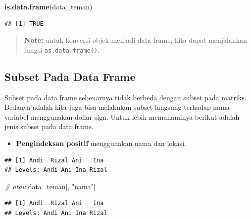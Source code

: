 \documentclass[]{book}
\newenvironment{Shaded}{\begin{snugshade}}{\end{snugshade}}
\newcommand{\KeywordTok}[1]{\textcolor[rgb]{0.13,0.29,0.53}{\textbf{#1}}}
\newcommand{\StringTok}[1]{\textcolor[rgb]{0.31,0.60,0.02}{#1}}
\newcommand{\CommentTok}[1]{\textcolor[rgb]{0.56,0.35,0.01}{\textit{#1}}}
\newcommand{\OperatorTok}[1]{\textcolor[rgb]{0.81,0.36,0.00}{\textbf{#1}}}
\newcommand{\NormalTok}[1]{#1}
\providecommand{\tightlist}{%
  \setlength{\itemsep}{0pt}\setlength{\parskip}{0pt}}
\begin{document}
\begin{Shaded}
\begin{Highlighting}[]
\KeywordTok{is.data.frame}\NormalTok{(data_teman)}
\end{Highlighting}
\end{Shaded}

\begin{verbatim}
## [1] TRUE
\end{verbatim}

\begin{quote}
\textbf{Note: } untuk konversi objek menjadi data frame, kita dapat
menjalankan fungsi \texttt{as.data.frame()}.
\end{quote}

\subsection{Subset Pada Data Frame}\label{subset-pada-data-frame}

Subset pada data frame sebenarnya tidak berbeda dengan subset pada
matriks. Bedanya adalah kita juga bisa melakukan subset langsung
terhadap nama variabel menggunakan dollar sign. Untuk lebih memahaminya
berikut adalah jenis subset pada data frame.

\begin{itemize}
\tightlist
\item
  \textbf{Pengindeksan positif} menggunakan nama dan lokasi.
\end{itemize}

\begin{Shaded}
\end{Shaded}

\begin{verbatim}
## [1] Andi  Rizal Ani   Ina  
## Levels: Andi Ani Ina Rizal
\end{verbatim}

\begin{Shaded}
\begin{Highlighting}[]
\CommentTok{# atau }
\NormalTok{data_teman[, }\StringTok{"nama"}\NormalTok{]}
\end{Highlighting}
\end{Shaded}

\begin{verbatim}
## [1] Andi  Rizal Ani   Ina  
## Levels: Andi Ani Ina Rizal
\end{verbatim}
\end{document}

